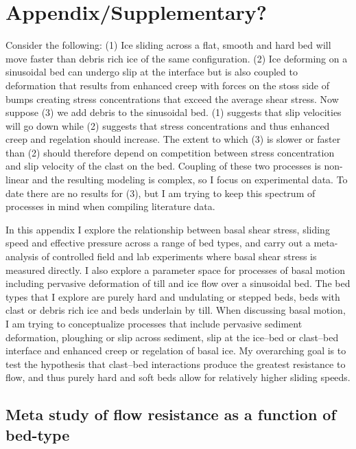 \documentclass[review]{igs}
\begin{document}
\bibstyle{}



\section{Appendix/Supplementary?}

Consider the following:  (1) Ice sliding across a flat, smooth and hard bed will move faster than debris rich ice of the same configuration. (2) Ice deforming on a sinusoidal bed can undergo slip at the interface but is also coupled to deformation that results from enhanced creep with forces on the stoss side of bumps creating stress concentrations that exceed the average shear stress. Now suppose (3) we add debris to the sinusoidal bed. (1) suggests that slip velocities will go down while (2) suggests that stress concentrations and thus enhanced creep and regelation should increase. The extent to which (3) is slower or faster than (2) should therefore depend on competition between stress concentration and slip velocity of the clast on the bed. Coupling of these two processes is non-linear and the resulting modeling is complex, so I focus on experimental data. To date there are no results for (3), but I am trying to keep this spectrum of processes in mind when compiling literature data. 

In this appendix I explore the relationship between basal shear stress, sliding speed and effective pressure across a range of bed types, and carry out a meta-analysis of controlled field and lab experiments where basal shear stress is measured directly. I also explore a parameter space for processes of basal motion including pervasive deformation of till and ice flow over a sinusoidal bed. The bed types that I explore are purely hard and undulating or stepped beds, beds with clast or debris rich ice and beds underlain by till. When discussing basal motion, I am trying to conceptualize processes that include pervasive sediment deformation, ploughing or slip across sediment, slip at the ice--bed or clast--bed interface and enhanced creep or regelation of basal ice. My overarching goal is to test the hypothesis that clast--bed interactions produce the greatest resistance to flow, and thus purely hard and soft beds allow for relatively higher sliding speeds. 

\subsection{Meta study of flow resistance as a function of bed-type}
\end{document}
